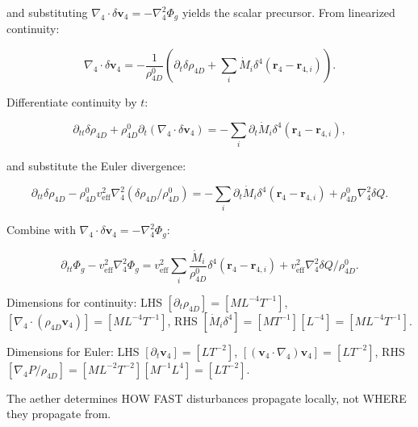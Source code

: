 and substituting $\nabla_4 \cdot \delta \mathbf{v}_4 = -\nabla_4^2 \Phi_g$ yields the scalar precursor. From linearized continuity:

\begin{equation}
\nabla_4 \cdot \delta \mathbf{v}_4 = -\frac{1}{\rho_{4D}^0} \left( \partial_t \delta \rho_{4D} + \sum_i \dot{M}_i \delta^4(\mathbf{r}_4 - \mathbf{r}_{4,i}) \right).
\end{equation}

Differentiate continuity by $t$:

\begin{equation}
\partial_{tt} \delta \rho_{4D} + \rho_{4D}^0 \partial_t (\nabla_4 \cdot \delta \mathbf{v}_4) = -\sum_i \partial_t \dot{M}_i \delta^4(\mathbf{r}_4 - \mathbf{r}_{4,i}),
\end{equation}

and substitute the Euler divergence:

\begin{equation}
\partial_{tt} \delta \rho_{4D} - \rho_{4D}^0 v_{\text{eff}}^2 \nabla_4^2 (\delta \rho_{4D} / \rho_{4D}^0) = -\sum_i \partial_t \dot{M}_i \delta^4(\mathbf{r}_4 - \mathbf{r}_{4,i}) + \rho_{4D}^0 \nabla_4^2 \delta Q.
\end{equation}

Combine with $\nabla_4 \cdot \delta \mathbf{v}_4 = -\nabla_4^2 \Phi_g$:

\begin{equation}
\partial_{tt} \Phi_g - v_{\text{eff}}^2 \nabla_4^2 \Phi_g = v_{\text{eff}}^2 \sum_i \frac{\dot{M}_i}{\rho_{4D}^0} \delta^4(\mathbf{r}_4 - \mathbf{r}_{4,i}) + v_{\text{eff}}^2 \nabla_4^2 \delta Q / \rho_{4D}^0.
\end{equation}

\begin{tcolorbox}[title=Dimensional Checks]
Dimensions for continuity: LHS $[\partial_t \rho_{4D}] = [M L^{-4} T^{-1}]$, $[\nabla_4 \cdot (\rho_{4D} \mathbf{v}_4)] = [M L^{-4} T^{-1}]$, RHS $[\dot{M}_i \delta^4] = [M T^{-1}] [L^{-4}] = [M L^{-4} T^{-1}]$.

Dimensions for Euler: LHS $[\partial_t \mathbf{v}_4] = [L T^{-2}]$, $[(\mathbf{v}_4 \cdot \nabla_4) \mathbf{v}_4] = [L T^{-2}]$, RHS $[\nabla_4 P / \rho_{4D}] = [M L^{-2} T^{-2}] [M^{-1} L^{4}] = [L T^{-2}]$.
\end{tcolorbox}

\begin{tcolorbox}
The aether determines HOW FAST disturbances propagate locally, not WHERE they propagate from.
\end{tcolorbox}


